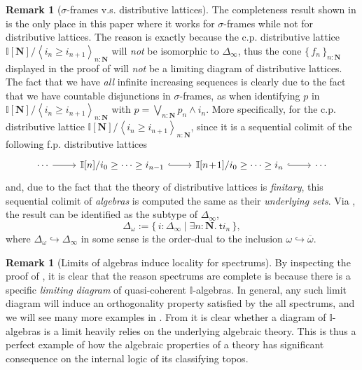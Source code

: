 \documentclass[12pt]{amsart}
\theoremstyle{definition}
\newtheorem{remark}[theorem]{Remark}
\newcommand{\mb}[1]{\mathbf{#1}}
\newcommand{\mbb}[1]{\mathbb{#1}}
\newcommand{\I}{\mbb I}
\newcommand{\ms}[1]{\mathsf{#1}}
\newcommand{\ov}[1]{\overline{#1}}
\newcommand{\set}[1]{\{\,#1\,\}}
\newcommand{\pair}[1]{\left\langle#1\right\rangle}
\newcommand{\scomp}[2]{\{\,#1\mid#2\,\}}
\newcommand{\hook}{\hookrightarrow}
\newcommand{\N}{\mb N}
\newcommand{\ex}[2]{\exists #1\!\colon\!\!#2.\ }
\begin{document}
\begin{remark}[$\sigma$-frames v.s. distributive lattices]\label{rem:whynotdis}
  The completeness result shown in  is the only place in this paper where it works for $\sigma$-frames while not for distributive lattices. The reason is exactly because the c.p. distributive lattice $\I[\N]/\pair{i_n \ge i_{n+1}}_{n:\N}$ will \emph{not} be isomorphic to $\Delta_\infty$, thus the cone $\set{f_n}_{n:\N}$ displayed in the proof of  will \emph{not} be a limiting diagram of distributive lattices. The fact that we have \emph{all} infinite increasing sequences is clearly due to the fact that we have countable disjunctions in $\sigma$-frames, as when identifying $p$ in $\I[\N]/\pair{i_n \ge i_{n+1}}_{n:\N}$ with $p = \bigvee_{n:\N}p_n\wedge i_n$. More specifically, for the c.p. distributive lattice $\I[\N]/\pair{i_n \ge i_{n+1}}_{n:\N}$, since it is a sequential colimit of the following f.p. distributive lattices
  \[ 
  \begin{tikzcd}
    \cdots \ar[r] & \I[n]/i_{0} \ge \cdots \ge i_{n-1} \ar[r, hook] & \I[n\!+\!1]/i_0 \ge \cdots \ge i_n \ar[r, hook] & \cdots
  \end{tikzcd}
  \]
  and, due to the fact that the theory of distributive lattices is \emph{finitary}, this sequential colimit of \emph{algebras} is computed the same as their \emph{underlying sets}. Via , the result can be identified as the subtype of $\Delta_\infty$,
  \[ \Delta_\omega := \scomp{i : \Delta_\infty}{\ex n\N \ms ti_n}, \]
  where $\Delta_\omega \hook \Delta_\infty$ in some sense is the order-dual to the inclusion $\omega\hook\ov\omega$.
\end{remark}

\begin{remark}[Limits of algebras induce locality for spectrums]\label{rem:limofalgloc}
  By inspecting the proof of , it is clear that the reason spectrums are complete is because there is a specific \emph{limiting diagram} of quasi-coherent $\I$-algebras. In general, any such limit diagram will induce an orthogonality property satisfied by the all spectrums, and we will see many more examples in . From  it is clear whether a diagram of $\I$-algebras is a limit heavily relies on the underlying algebraic theory. This is thus a perfect example of how the algebraic properties of a theory has significant consequence on the internal logic of its classifying topos.
\end{remark}
\end{document}
